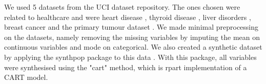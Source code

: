 We used 5 datasets from the UCI dataset repository. The ones chosen were related to healthcare and were heart disease \cite{misc_heart_disease_45}, thyroid disease \cite{misc_thyroid_disease_102}, liver disorders \cite{misc_liver_disorders_60}, breast cancer \cite{misc_breast_cancer_wisconsin_(diagnostic)_17} and the primary tumour dataset \cite{misc_primary_tumor_83}. We made minimal preprocessing on the datasets, namely removing the missing variables by imputing the mean on continuous variables and mode on categorical.
We also created a synthetic dataset by applying the synthpop package to this data \cite{synthpop}. With this package, all variables were synthesised using the "cart" method, which is rpart implementation of a CART model.

